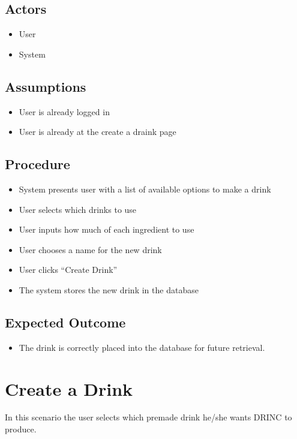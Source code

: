 {        \subsection{Actors}
            \begin{itemize}
                \item User
                \item System
            \end{itemize}
        \subsection{Assumptions}
            \begin{itemize}
                \item User is already logged in
                \item User is already at the create a draink page
            \end{itemize}
        \subsection{Procedure}
            \begin{itemize}
                \item System presents user with a list of available options to 
                make a drink
                \item User selects which drinks to use
                \item User inputs how much of each ingredient to use
                \item User chooses a name for the new drink
                \item User clicks ``Create Drink''
                \item The system stores the new drink in the database
            \end{itemize}
        \subsection{Expected Outcome}
            \begin{itemize}
                \item The drink is correctly placed into the database for 
                future retrieval.
            \end{itemize}
    
    \section{Create a Drink}
        In this scenario the user selects which premade drink he/she wants 
        DRINC to produce.
}
